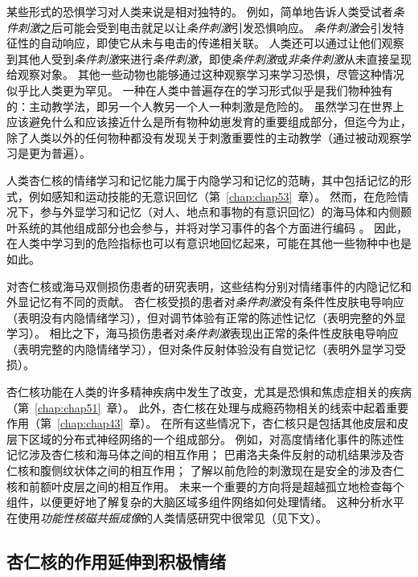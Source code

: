 某些形式的恐惧学习对人类来说是相对独特的。
例如，简单地告诉人类受试者\textit{条件刺激}之后可能会受到电击就足以让\textit{条件刺激}引发恐惧响应。
\textit{条件刺激}会引发特征性的自动响应，即使它从未与电击的传递相关联。
人类还可以通过让他们观察到其他人受到\textit{条件刺激}来进行\textit{条件刺激}，即使\textit{条件刺激}或\textit{非条件刺激}从未直接呈现给观察对象。
其他一些动物也能够通过这种观察学习来学习恐惧，尽管这种情况似乎比人类更为罕见。
一种在人类中普遍存在的学习形式似乎是我们物种独有的：主动教学法，即另一个人教另一个人一种刺激是危险的。
虽然学习在世界上应该避免什么和应该接近什么是所有物种幼崽发育的重要组成部分，但迄今为止，除了人类以外的任何物种都没有发现关于刺激重要性的主动教学（通过被动观察学习是更为普遍）。


人类杏仁核的情绪学习和记忆能力属于内隐学习和记忆的范畴，其中包括记忆的形式，例如感知和运动技能的无意识回忆（第~\ref{chap:chap53}~章）。
然而，在危险情况下，参与外显学习和记忆（对人、地点和事物的有意识回忆）的海马体和内侧颞叶系统的其他组成部分也会参与，并将对学习事件的各个方面进行编码 。
因此，在人类中学习到的危险指标也可以有意识地回忆起来，可能在其他一些物种中也是如此。


对杏仁核或海马双侧损伤患者的研究表明，这些结构分别对情绪事件的内隐记忆和外显记忆有不同的贡献。
杏仁核受损的患者对\textit{条件刺激}没有条件性皮肤电导响应（表明没有内隐情绪学习），但对调节体验有正常的陈述性记忆（表明完整的外显学习）。
相比之下，海马损伤患者对\textit{条件刺激}表现出正常的条件性皮肤电导响应（表明完整的内隐情绪学习），但对条件反射体验没有自觉记忆（表明外显学习受损）。


杏仁核功能在人类的许多精神疾病中发生了改变，尤其是恐惧和焦虑症相关的疾病（第~\ref{chap:chap51}~章）。
此外，杏仁核在处理与成瘾药物相关的线索中起着重要作用（第~\ref{chap:chap43}~章）。
在所有这些情况下，杏仁核只是包括其他皮层和皮层下区域的分布式神经网络的一个组成部分。
例如，对高度情绪化事件的陈述性记忆涉及杏仁核和海马体之间的相互作用；
巴甫洛夫条件反射的动机结果涉及杏仁核和腹侧纹状体之间的相互作用；
了解以前危险的刺激现在是安全的涉及杏仁核和前额叶皮层之间的相互作用。
未来一个重要的方向将是超越孤立地检查每个组件，以便更好地了解复杂的大脑区域多组件网络如何处理情绪。
这种分析水平在使用\textit{功能性核磁共振成像}的人类情感研究中很常见（见下文）。



\subsection{杏仁核的作用延伸到积极情绪}

